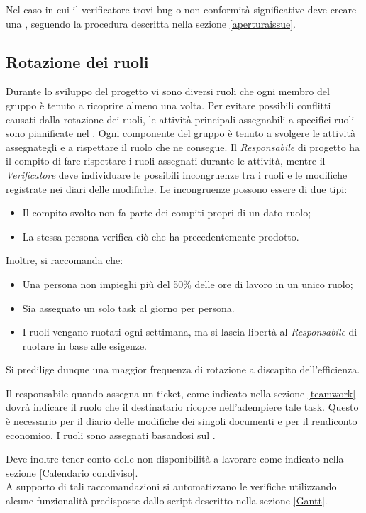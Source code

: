 Nel caso in cui il verificatore trovi bug o non conformità significative deve creare una , seguendo la procedura descritta nella sezione \ref{aperturaissue}.

\subsection{Rotazione dei ruoli}
\label{rotazioneruoli}
Durante lo sviluppo del progetto vi sono diversi ruoli che ogni membro del gruppo \GroupName{} è tenuto a ricoprire almeno una volta. Per evitare possibili conflitti causati dalla rotazione dei ruoli, le attività principali assegnabili a specifici ruoli sono pianificate nel \PianoDiProgetto. Ogni componente del gruppo è tenuto a svolgere le attività assegnategli e a rispettare il ruolo che ne consegue. Il \textit{Responsabile} di progetto ha il compito di fare rispettare i ruoli assegnati durante le attività, mentre il \textit{Verificatore} deve individuare le possibili incongruenze tra i ruoli e le modifiche registrate nei diari delle modifiche.
Le incongruenze possono essere di due tipi:
\begin{itemize}
\item Il compito svolto non fa parte dei compiti propri di un dato ruolo;
\item La stessa persona verifica ciò che ha precedentemente prodotto.
\end{itemize}

Inoltre, si raccomanda che:
\begin{itemize}
\item Una persona non impieghi più del 50\% delle ore di lavoro in un unico ruolo;
\item Sia assegnato un solo task al giorno per persona.
\item I ruoli vengano ruotati ogni settimana, ma si lascia libertà al \textit{Responsabile} di ruotare in base alle esigenze.
\end{itemize}

Si predilige dunque una maggior frequenza di rotazione a discapito dell'efficienza.

Il responsabile quando assegna un ticket, come indicato nella sezione \ref{teamwork} dovrà indicare il ruolo che il destinatario ricopre nell'adempiere tale task. Questo è necessario per il diario delle modifiche dei singoli documenti e per il rendiconto economico. I ruoli sono assegnati basandosi sul \PianoDiProgetto. 

Deve inoltre tener conto delle non disponibilità a lavorare come indicato nella sezione \ref{Calendario condiviso}. \\
A supporto di tali raccomandazioni si automatizzano le verifiche utilizzando alcune funzionalità predisposte dallo script descritto nella sezione \ref{Gantt}.

